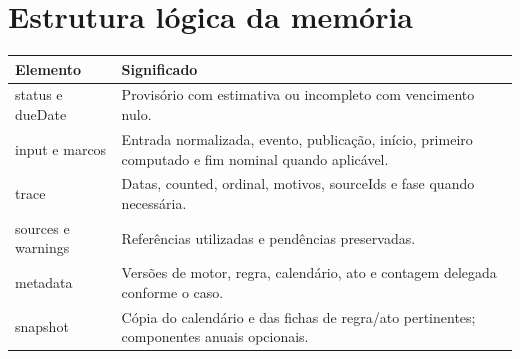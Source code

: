 \section{Estrutura lógica da memória}
\label{section-B-3}
\begin{quadro}[H]\centering
\caption{Principais elementos de CalculationResult}
\label{quadro-6}
\begin{singlespace}\fontsize{10}{12}\selectfont
\begin{tabularx}{\linewidth}{|>{\raggedright\arraybackslash}X|>{\raggedright\arraybackslash}X|}
\hline
\textbf{Elemento} & \textbf{Significado} \\
\hline
status e dueDate & Provisório com estimativa ou incompleto com vencimento nulo. \\
\hline
input e marcos & Entrada normalizada, evento, publicação, início, primeiro computado e fim nominal quando aplicável. \\
\hline
trace & Datas, counted, ordinal, motivos, sourceIds e fase quando necessária. \\
\hline
sources e warnings & Referências utilizadas e pendências preservadas. \\
\hline
metadata & Versões de motor, regra, calendário, ato e contagem delegada conforme o caso. \\
\hline
snapshot & Cópia do calendário e das fichas de regra/ato pertinentes; componentes anuais opcionais. \\
\hline
\end{tabularx}\end{singlespace}
\par{}
\end{quadro}
